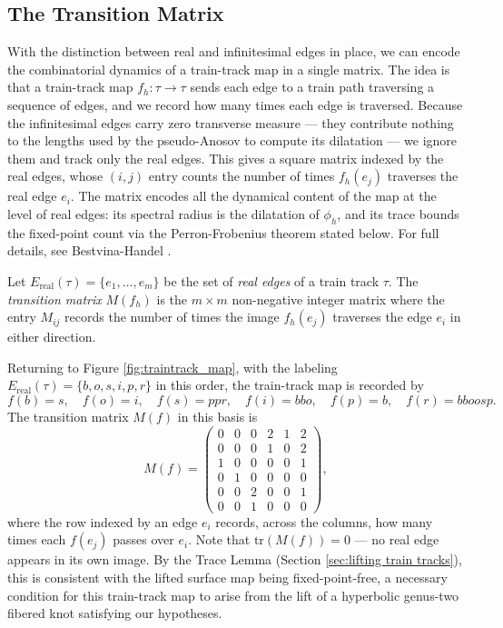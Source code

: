 \subsection*{The Transition Matrix}
With the distinction between real and infinitesimal edges in place, we can encode the combinatorial dynamics of a train-track map in a single matrix. The idea is that a train-track map $f_h: \tau \to \tau$ sends each edge to a train path traversing a sequence of edges, and we record how many times each edge is traversed. Because the infinitesimal edges carry zero transverse measure --- they contribute nothing to the lengths used by the pseudo-Anosov to compute its dilatation --- we ignore them and track only the real edges. This gives a square matrix indexed by the real edges, whose $(i,j)$ entry counts the number of times $f_h(e_j)$ traverses the real edge $e_i$. The matrix encodes all the dynamical content of the map at the level of real edges: its spectral radius is the dilatation of $\phi_h$, and its trace bounds the fixed-point count via the Perron-Frobenius theorem stated below. For full details, see Bestvina-Handel \cite{bestvina1995train}.

\begin{definition}
    Let $E_{\text{real}}(\tau) = \{e_1, \dots, e_m\}$ be the set of \textit{real edges} of a train track $\tau$. The \textit{transition matrix} $M(f_h)$ is the $m \times m$ non-negative integer matrix where the entry $M_{ij}$ records the number of times the image $f_h(e_j)$ traverses the edge $e_i$ in either direction.
\end{definition}

\begin{eg}\label{ex:transition_matrix_candelabra}
Returning to Figure \ref{fig:traintrack_map}, with the labeling $E_{\text{real}}(\tau) = \{b, o, s, i, p, r\}$ in this order, the train-track map is recorded by
\[
f(b) = s, \quad f(o) = i, \quad f(s) = ppr, \quad f(i) = bbo, \quad f(p) = b, \quad f(r) = bboosp.
\]
The transition matrix $M(f)$ in this basis is
\[
M(f) =
\begin{pmatrix}
0 & 0 & 0 & 2 & 1 & 2 \\
0 & 0 & 0 & 1 & 0 & 2 \\
1 & 0 & 0 & 0 & 0 & 1 \\
0 & 1 & 0 & 0 & 0 & 0 \\
0 & 0 & 2 & 0 & 0 & 1 \\
0 & 0 & 1 & 0 & 0 & 0
\end{pmatrix},
\]
where the row indexed by an edge $e_i$ records, across the columns, how many times each $f(e_j)$ passes over $e_i$. Note that $\mathrm{tr}(M(f)) = 0$ --- no real edge appears in its own image. By the Trace Lemma (Section \ref{sec:lifting train tracks}), this is consistent with the lifted surface map being fixed-point-free, a necessary condition for this train-track map to arise from the lift of a hyperbolic genus-two fibered knot satisfying our hypotheses.
\end{eg}

